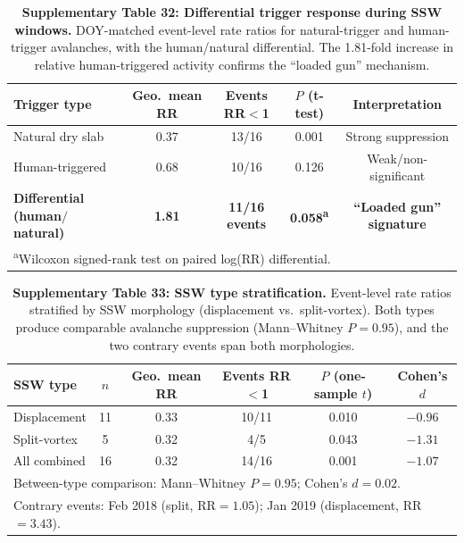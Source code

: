\begin{table}[htbp]
\centering
\caption{\textbf{Supplementary Table 32: Differential trigger response during SSW windows.} DOY-matched event-level rate ratios for natural-trigger and human-trigger avalanches, with the human/natural differential. The 1.81-fold increase in relative human-triggered activity confirms the ``loaded gun'' mechanism.}
\label{tab:trigger_differential}
\small
\begin{tabular}{lcccc}
\toprule
\textbf{Trigger type} & \textbf{Geo.\ mean RR} & \textbf{Events RR$<$1} & \textbf{$P$ (t-test)} & \textbf{Interpretation} \\
\midrule
Natural dry slab & 0.37 & 13/16 & 0.001 & Strong suppression \\
Human-triggered & 0.68 & 10/16 & 0.126 & Weak/non-significant \\
\midrule
\textbf{Differential (human$/$natural)} & \textbf{1.81} & \textbf{11/16 events} & \textbf{0.058\textsuperscript{a}} & \textbf{``Loaded gun'' signature} \\
\bottomrule
\multicolumn{5}{l}{\footnotesize \textsuperscript{a}Wilcoxon signed-rank test on paired log(RR) differential.} \\
\end{tabular}
\end{table}

\begin{table}[htbp]
\centering
\caption{\textbf{Supplementary Table 33: SSW type stratification.} Event-level rate ratios stratified by SSW morphology (displacement vs.\ split-vortex). Both types produce comparable avalanche suppression (Mann--Whitney $P = 0.95$), and the two contrary events span both morphologies.}
\label{tab:ssw_type}
\small
\begin{tabular}{lccccc}
\toprule
\textbf{SSW type} & \textbf{$n$} & \textbf{Geo.\ mean RR} & \textbf{Events RR$<$1} & \textbf{$P$ (one-sample $t$)} & \textbf{Cohen's $d$} \\
\midrule
Displacement & 11 & 0.33 & 10/11 & 0.010 & $-0.96$ \\
Split-vortex & 5 & 0.32 & 4/5 & 0.043 & $-1.31$ \\
\midrule
All combined & 16 & 0.32 & 14/16 & 0.001 & $-1.07$ \\
\bottomrule
\multicolumn{6}{l}{\footnotesize Between-type comparison: Mann--Whitney $P = 0.95$; Cohen's $d = 0.02$.} \\
\multicolumn{6}{l}{\footnotesize Contrary events: Feb 2018 (split, RR$=1.05$); Jan 2019 (displacement, RR$=3.43$).} \\
\end{tabular}
\end{table}

